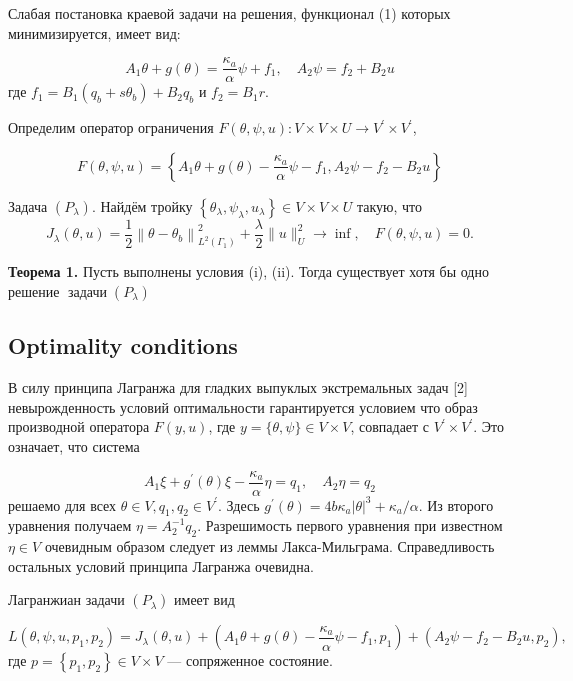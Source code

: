 Слабая постановка краевой задачи на
решения, функционал (1) которых минимизируется, имеет вид:

\[
    A_{1} \theta+g(\theta)=\frac{\kappa_{a}}{\alpha} \psi+f_{1}, \quad A_{2} \psi=f_{2}+B_{2} u
\]
где $f_{1}=B_{1}\left(q_{b}+s \theta_{b}\right)+B_{2} q_{b}$ и $f_{2}=B_{1} r$.

Определим оператор ограничения $F(\theta, \psi, u): V \times V \times U \rightarrow V^{\prime} \times V^{\prime}$,

\[
    F(\theta, \psi, u)=\left\{A_{1} \theta+g(\theta)
    - \frac{\kappa_{a}}{\alpha} \psi-f_{1}, A_{2} \psi-f_{2}-B_{2} u\right\}
\]

Задача $\left(P_{\lambda}\right)$.
Найдём тройку $\left\{\theta_{\lambda}, \psi_{\lambda}, u_{\lambda}\right\} \in V \times V \times U$
такую, что
\[
    J_{\lambda}(\theta, u)=\frac{1}{2}\left\|\theta-\theta_{b}\right\|_{L^{2}\left(\Gamma_{1}\right)}^{2}
    + \frac{\lambda}{2}\|u\|_{U}^{2} \rightarrow \inf , \quad F(\theta, \psi, u)=0.
\]

\textbf{Теорема 1.}
Пусть выполнены условия (i), (ii).
Тогда существует хотя бы одно решение $\operatorname{задачи}\left(P_{\lambda}\right)$

\subsection{Optimality conditions}
В силу принципа Лагранжа для гладких выпуклых экстремальных задач [2]
невырожденность условий оптимальности гарантируется условием
что образ производной оператора
$F(y, u)$, где $y=\{\theta, \psi\} \in V \times V$, совпадает с $V^{\prime} \times V^{\prime}$.
Это означает, что система


\[
    A_{1} \xi+g^{\prime}(\theta) \xi-\frac{\kappa_{a}}{\alpha} \eta=q_{1}, \quad A_{2} \eta=q_{2}
\]
решаемо для всех $\theta \in V, q_{1}, q_{2} \in V^{\prime}$.
Здесь $g^{\prime}(\theta)=4b\kappa_{a}|\theta|^{3}+\kappa_{a} / \alpha$.
Из второго уравнения получаем $\eta=A_{2}^{-1} q_{2}$.
Разрешимость первого уравнения при известном $\eta \in V$ очевидным образом следует из леммы Лакса-Мильграма.
Справедливость остальных условий принципа Лагранжа очевидна.

Лагранжиан задачи $\left(P_{\lambda}\right)$ имеет вид

\[
    L\left(\theta, \psi, u, p_{1}, p_{2}\right)=J_{\lambda}(\theta, u)
    + \left(A_{1} \theta+g(\theta)-\frac{\kappa_{a}}{\alpha} \psi-f_{1},
    p_{1}\right)+\left(A_{2} \psi-f_{2}-B_{2} u, p_{2}\right),
\]
где $p=\left\{p_{1}, p_{2}\right\} \in V \times V$ — сопряженное состояние.

